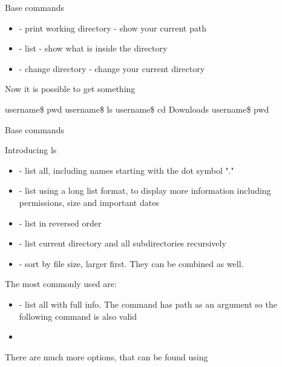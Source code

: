\documentclass[usenames,dvipsnames,10pt,aspectratio=169]{beamer}
\begin{document}
\begin{frame}{Base commands}
\begin{itemize}
    \item {} - print working directory - show your current path
    \item {} - list - show what is inside the directory
    \item {} - change directory - change your current directory
\end{itemize}
Now it is possible to get something 
\begin{examples}
    username\$ pwd \newline
     \newline
    username\$ ls \newline
     \newline
    username\$ cd Downloads \newline
    username\$ pwd \newline
\end{examples}
\end{frame}
\begin{frame}{Base commands}

{\Large{Introducing ls}} \newline
\begin{itemize}
    \item {} - list all, including names starting with the dot symbol "."
    \item {} - list using a long list format, to display more information including permissions, size and important dates
    \item {} - list in reversed order
    \item {} - list current directory and all subdirectories recursively
    \item {} - sort by file size, larger first. They can be combined as well.
\end{itemize}
The most commonly used are:
\begin{itemize}
    \item {} - list all with full info. The command has path as an argument so the following command is also valid
    \item {}
\end{itemize}
There are much more options, that can be found using 
\end{frame}
\end{document}
